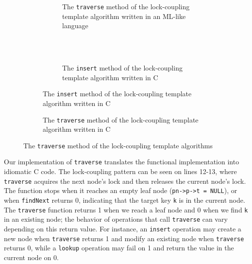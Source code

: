 \documentclass[a4paper,UKenglish,cleveref, autoref, thm-restate]{lipics-v2021}
\newcommand{\wm}[1]{\textbf{\textcolor{violet}{[William: #1]}}}
\begin{document}
\begin{figure}[h]
	\begin{subfigure}[t]{0.48\textwidth}
		\begin{subfigure}[t]{\textwidth}
			 
			\caption{The \lstinline{traverse} method of the lock-coupling template algorithm written in an ML-like language \cite{krishna2019compositional}} 
			\label{traverse_lock_a}	
		\end{subfigure}
		\\ \\ 
		\renewcommand{\thesubfigure}{c}%
		\begin{subfigure}[t]{\textwidth}
			 
			\caption{The \lstinline{insert} method of the lock-coupling template algorithm written in C}
			\label{insert_lock}	
		\end{subfigure}
	\end{subfigure}\qquad
	\renewcommand{\thesubfigure}{b}%
	\begin{subfigure}[t]{0.48\textwidth}
		 
		\caption{The \lstinline{traverse} method of the lock-coupling template algorithm written in C}
		\label{traverse_lock_b}
	\end{subfigure}
	\caption{The \lstinline{traverse} method of the lock-coupling template algorithms 
	}
	\label{traverse_lock}
\end{figure}

Our implementation of \lstinline{traverse} translates the functional implementation into idiomatic C code. The lock-coupling pattern can be seen on lines 12-13, where \lstinline{traverse} acquires the next node's lock and then releases the current node's lock. The function stops when it reaches an empty leaf node (\lstinline{pn->p->t = NULL}), or when \lstinline{findNext} returns 0, indicating that the target key \lstinline{k} is in the current node. The \lstinline{traverse} function returns 1 when we reach a leaf node and 0 when we find \lstinline{k} in an existing node; the behavior of operations that call \lstinline{traverse} can vary depending on this return value. For instance, an \lstinline{insert} operation may create a new node when \lstinline{traverse} returns 1 and modify an existing node when \lstinline{traverse} returns 0, while a \lstinline{lookup} operation may fail on 1 and return the value in the current node on 0.
\end{document}
